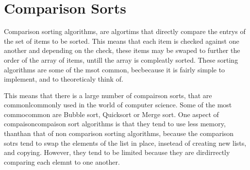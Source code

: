 \documentclass{subfile}
\begin{document}
\section{Comparison Sorts}\label{sec:comparison_sorts}

Comparison sorting algorithms, are algortims that directly compare the
entrys of the set of items to be sorted. This means that each item is
checked against one another and depending on the check, these items may be
swaped to further the order of the array of items, untill the array is
compleatly sorted. These sorting algorithms are some of the msot common,
becbecause it is fairly simple to implement, and to theoreticaly think of.

This means that there is a large number of compairson sorts, that are
commonlcommonly used in the world of computer science. Some of the most
commocommon are Bubble sort, Quicksort or Merge sort. One aspect of
compaisoncompaison sort algorithms is that they tend to use less memory,
thanthan that of non comparison sorting algorithms, because the comparison
sotrs tend to swap the elements of the list in place, insetead of creating
new lists, and copying. However, they tend to be limited because they are
dirdirrectly comparing each elemnt to one another.

\secttoc
\newpage

\newpage

\newpage

\newpage

\newpage

\newpage

\end{document}
